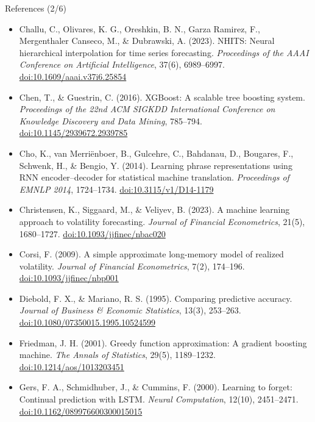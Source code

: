 \begin{frame}{References (2/6)}
\itemsize{\tiny}
\begin{itemize}
    \item Challu, C., Olivares, K. G., Oreshkin, B. N., Garza Ramirez, F., Mergenthaler Canseco, M., \& Dubrawski, A. (2023). NHITS: Neural hierarchical interpolation for time series forecasting. \textit{Proceedings of the AAAI Conference on Artificial Intelligence}, 37(6), 6989--6997. \href{https://doi.org/10.1609/aaai.v37i6.25854}{doi:10.1609/aaai.v37i6.25854}
    \item Chen, T., \& Guestrin, C. (2016). XGBoost: A scalable tree boosting system. \textit{Proceedings of the 22nd ACM SIGKDD International Conference on Knowledge Discovery and Data Mining}, 785--794. \href{https://doi.org/10.1145/2939672.2939785}{doi:10.1145/2939672.2939785}
    \item Cho, K., van Merriënboer, B., Gulcehre, C., Bahdanau, D., Bougares, F., Schwenk, H., \& Bengio, Y. (2014). Learning phrase representations using RNN encoder--decoder for statistical machine translation. \textit{Proceedings of EMNLP 2014}, 1724--1734. \href{https://doi.org/10.3115/v1/D14-1179}{doi:10.3115/v1/D14-1179}
    \item Christensen, K., Siggaard, M., \& Veliyev, B. (2023). A machine learning approach to volatility forecasting. \textit{Journal of Financial Econometrics}, 21(5), 1680--1727. \href{https://doi.org/10.1093/jjfinec/nbac020}{doi:10.1093/jjfinec/nbac020}
    \item Corsi, F. (2009). A simple approximate long-memory model of realized volatility. \textit{Journal of Financial Econometrics}, 7(2), 174--196. \href{https://doi.org/10.1093/jjfinec/nbp001}{doi:10.1093/jjfinec/nbp001}
    \item Diebold, F. X., \& Mariano, R. S. (1995). Comparing predictive accuracy. \textit{Journal of Business \& Economic Statistics}, 13(3), 253--263. \href{https://doi.org/10.1080/07350015.1995.10524599}{doi:10.1080/07350015.1995.10524599}
    \item Friedman, J. H. (2001). Greedy function approximation: A gradient boosting machine. \textit{The Annals of Statistics}, 29(5), 1189--1232. \href{https://doi.org/10.1214/aos/1013203451}{doi:10.1214/aos/1013203451}
    \item Gers, F. A., Schmidhuber, J., \& Cummins, F. (2000). Learning to forget: Continual prediction with LSTM. \textit{Neural Computation}, 12(10), 2451--2471. \href{https://doi.org/10.1162/089976600300015015}{doi:10.1162/089976600300015015}

\end{itemize}
\end{frame}
